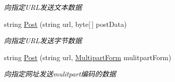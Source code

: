 \begin{DoxyCompactItemize}
\begin{DoxyCompactList}\small\item\em 向指定\+U\+R\+L发送文本数据 \end{DoxyCompactList}\item 
string \hyperlink{class_x_c_l_net_tools_1_1_file_handler_1_1_web_client_ad799cba2f787fba4c0ca4fc6e86ee831}{Post} (string url, byte\mbox{[}$\,$\mbox{]} post\+Data)
\begin{DoxyCompactList}\small\item\em 向指定\+U\+R\+L发送字节数据 \end{DoxyCompactList}\item 
string \hyperlink{class_x_c_l_net_tools_1_1_file_handler_1_1_web_client_ab1556a7a601a8425c7d6bcecb09d6cf2}{Post} (string url, \hyperlink{class_x_c_l_net_tools_1_1_file_handler_1_1_multipart_form}{Multipart\+Form} mulitpart\+Form)
\begin{DoxyCompactList}\small\item\em 向指定网址发送mulitpart编码的数据 \end{DoxyCompactList}\end{DoxyCompactItemize}
